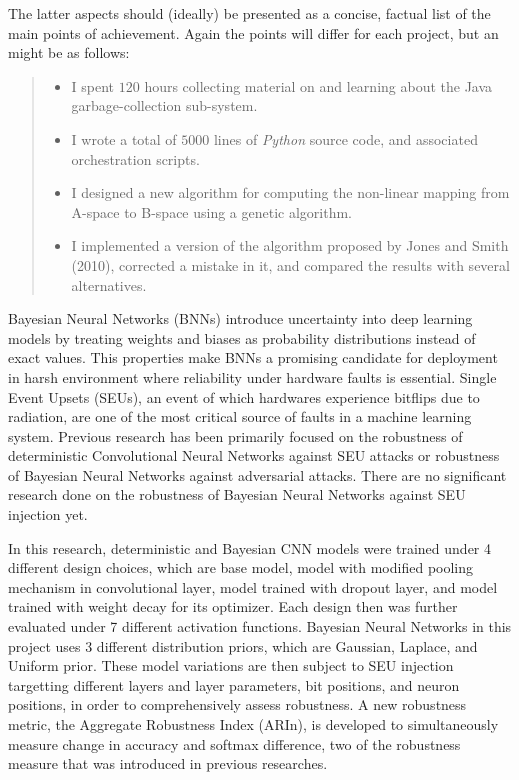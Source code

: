 \documentclass[ %
                    author={Revalda Putawara},
                supervisor={Dr. James Pope},
                    degree={MSc},
                     title={Robustness of Bayesian Neural Networks Design Choices Against Weight and Bias Perturbation Induced by Single Event Upsets (SEUs)},
                      type={},
                      year={2025}]{dissertation}
\begin{document}
\noindent
The latter aspects should (ideally) be presented as a concise, factual 
list of the main points of achievement.  Again the points will differ for each project, but 
an might be as follows:

\begin{quote}
\noindent
\begin{itemize}
\item I spent $120$ hours collecting material on and learning about the 
      Java garbage-collection sub-system. 
\item I wrote a total of $5000$ lines of {\em Python} source code, and associated orchestration scripts. 
\item I designed a new algorithm for computing the non-linear mapping 
      from A-space to B-space using a genetic algorithm.
\item I implemented a version of the algorithm proposed by Jones and 
      Smith (2010), corrected a mistake in it, and 
      compared the results with several alternatives.
\end{itemize}
\end{quote}
\fi

\iffalse
Bayesian Neural Networks (BNNs) introduce uncertainty into deep learning models by treating weights and biases as probability distributions instead of exact values. This properties make BNNs a promising candidate for deployment in harsh environment where reliability under hardware faults is essential. Single Event Upsets (SEUs), an event of which hardwares experience bitflips due to radiation, are one of the most critical source of faults in a machine learning system. Previous research has been primarily focused on the robustness of deterministic Convolutional Neural Networks against SEU attacks or robustness of Bayesian Neural Networks against adversarial attacks. There are no significant research done on the robustness of Bayesian Neural Networks against SEU injection yet.

In this research, deterministic and Bayesian CNN models were trained under 4 different design choices, which are base model, model with modified pooling mechanism in convolutional layer, model trained with dropout layer, and model trained with weight decay for its optimizer. Each design then was further evaluated under 7 different activation functions. Bayesian Neural Networks in this project uses 3 different distribution priors, which are Gaussian, Laplace, and Uniform prior. These model variations are then subject to SEU injection targetting different layers and layer parameters, bit positions, and neuron positions, in order to comprehensively assess robustness. A new robustness metric, the Aggregate Robustness Index (ARIn), is developed to simultaneously measure change in accuracy and softmax difference, two of the robustness measure that was introduced in previous researches.
\end{document}
